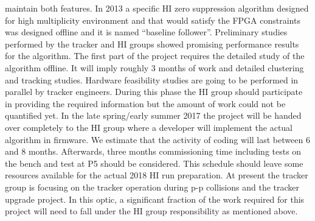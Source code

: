 maintain both features. In 2013 a specific HI zero suppression algorithm designed for high multiplicity environment and
that would satisfy the FPGA constraints was designed offline and it is named “baseline follower”.  Preliminary studies
performed by the tracker and HI groups showed promising performance results for the algorithm. The first part of the
project requires the detailed study of the algorithm offline. It will imply roughly 3 months of work and detailed
clustering and tracking studies. Hardware feasibility studies are going to be performed in parallel by tracker
engineers. During this phase the HI group should participate in providing the required information but the amount of
work could not be quantified yet. In the late spring/early summer 2017 the project will be handed over completely to the
HI group where a developer will implement the actual algorithm in firmware. We estimate that the activity of coding will
last between 6 and 8 months. Afterwards, three months commissioning time including tests on the bench and test at P5
should be considered. This schedule should leave some resources available for the actual 2018 HI run preparation. At
present the tracker group is focusing on the tracker operation during p-p collisions and the tracker upgrade project. In
this optic, a significant fraction of the work required for this project will need to fall under the HI group
responsibility as mentioned above. 
